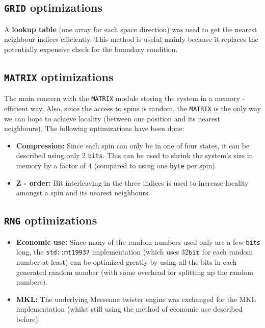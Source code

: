 \documentclass[letterpaper]{article}
\begin{document}
\subsection{\texttt{GRID} optimizations} A \textbf{lookup table} (one array for each space direction) was used to get the nearest neighbour indices efficiently. This method is useful mainly because it replaces the potentially expensive check for the boundary condition.
\subsection{\texttt{MATRIX} optimizations} The main concern with the \texttt{MATRIX} module storing the system in a memory - efficient way. Also, since the access to spins is random, the \texttt{MATRIX} is the only way we can hope to achieve locality (between one position and its nearest neighbours). The following optimizations have been done:
\begin{itemize}[noitemsep, topsep = 0pt]
\item\textbf{Compression:} Since each spin can only be in one of four states, it can be described using only 2 \texttt{bits}. This can be used to shrink the system's size in memory by a factor of $4$ (compared to using one \texttt{byte} per spin).
\item{\textbf{Z - order:}} Bit interleaving in the three indices is used to increase locality amongst a spin and its nearest neighbours.
\end{itemize}
\subsection{\texttt{RNG} optimizations} \label{opt:rng}
\begin{itemize}[noitemsep, topsep = 0pt]
\item \textbf{Economic use:} Since many of the random numbers used only are a few \texttt{bits} long, the \texttt{std::mt19937} implementation (which uses $32 \mathtt{bit}$ for each random number at least) can be optimized greatly by using all the bits in each generated random number (with some overhead for splitting up the random numbers).
\item \textbf{MKL:} The underlying Mersenne twister engine was exchanged for the MKL implementation \cite{MKL} (whilst still using the method of economic use described before).
\end{itemize}
\end{document}
